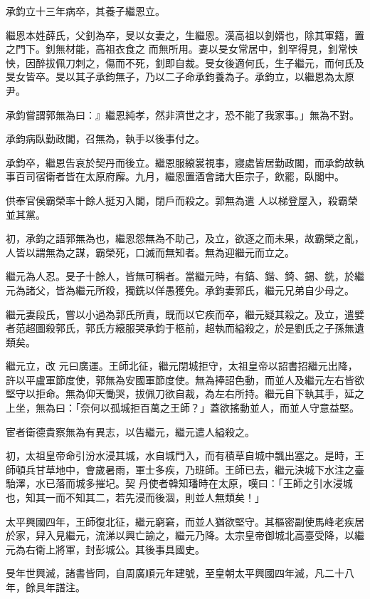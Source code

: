 \begin{pinyinscope}
 承鈞立十三年病卒，其養子繼恩立。



 繼恩本姓薛氏，父釗為卒，旻以女妻之，生繼恩。漢高祖以釗婿也，除其軍籍，置之門下。釗無材能，高祖衣食之
 而無所用。妻以旻女常居中，釗罕得見，釗常怏怏，因醉拔佩刀刺之，傷而不死，釗即自裁。旻女後適何氏，生子繼元，而何氏及旻女皆卒。旻以其子承鈞無子，乃以二子命承鈞養為子。承鈞立，以繼恩為太原尹。



 承鈞嘗謂郭無為曰：』繼恩純孝，然非濟世之才，恐不能了我家事。」無為不對。



 承鈞病臥勤政閣，召無為，執手以後事付之。



 承鈞卒，繼恩告哀於契丹而後立。繼恩服縗裳視事，寢處皆居勤政閣，而承鈞故執事百司宿衛者皆在太原府廨。九月，繼恩置酒會諸大臣宗子，飲罷，臥閣中。



 供奉官侯霸榮率十餘人挺刃入閣，閉戶而殺之。郭無為遣
 人以梯登屋入，殺霸榮並其黨。



 初，承鈞之語郭無為也，繼恩怨無為不助己，及立，欲逐之而未果，故霸榮之亂，人皆以謂無為之謀，霸榮死，口滅而無知者。無為迎繼元而立之。



 繼元為人忍。旻子十餘人，皆無可稱者。當繼元時，有鎬、鍇、錡、錫、銑，於繼元為諸父，皆為繼元所殺，獨銑以佯愚獲免。承鈞妻郭氏，繼元兄弟自少母之。



 繼元妻段氏，嘗以小過為郭氏所責，既而以它疾而卒，繼元疑其殺之。及立，遣嬖者范超圖殺郭氏，郭氏方縗服哭承鈞于柩前，超執而縊殺之，於是劉氏之子孫無遺類矣。



 繼元立，改
 元曰廣運。王師北征，繼元閉城拒守，太祖皇帝以詔書招繼元出降，許以平盧軍節度使，郭無為安國軍節度使。無為捧詔色動，而並人及繼元左右皆欲堅守以拒命。無為仰天慟哭，拔佩刀欲自裁，為左右所持。繼元自下執其手，延之上坐，無為曰：「奈何以孤城拒百萬之王師？」蓋欲搖動並人，而並人守意益堅。



 宦者衛德貴察無為有異志，以告繼元，繼元遣人縊殺之。



 初，太祖皇帝命引汾水浸其城，水自城門入，而有積草自城中飄出塞之。是時，王師頓兵甘草地中，會歲暑雨，軍士多疾，乃班師。王師已去，繼元決城下水注之臺駘澤，水已落而城多摧圮。契
 丹使者韓知璠時在太原，嘆曰：「王師之引水浸城也，知其一而不知其二，若先浸而後涸，則並人無類矣！」



 太平興國四年，王師復北征，繼元窮窘，而並人猶欲堅守。其樞密副使馬峰老疾居於家，舁入見繼元，流涕以興亡諭之，繼元乃降。太宗皇帝御城北高臺受降，以繼元為右衛上將軍，封彭城公。其後事具國史。



 旻年世興滅，諸書皆同，自周廣順元年建號，至皇朝太平興國四年滅，凡二十八年，餘具年譜注。



\end{pinyinscope}